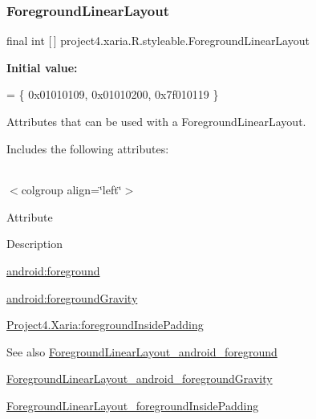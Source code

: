 \subsubsection{\texorpdfstring{Foreground\+Linear\+Layout}{ForegroundLinearLayout}}
{\footnotesize\ttfamily final int \mbox{[}$\,$\mbox{]} project4.\+xaria.\+R.\+styleable.\+Foreground\+Linear\+Layout\hspace{0.3cm}{\ttfamily [static]}}

{\bfseries Initial value\+:}
\begin{DoxyCode}
= \{
            0x01010109, 0x01010200, 0x7f010119
        \}
\end{DoxyCode}
Attributes that can be used with a Foreground\+Linear\+Layout. 

Includes the following attributes\+:

\tabulinesep=1mm
\begin{longtabu} spread 0pt [c]{*{0}{|X[-1]}|}
\hline
\end{longtabu}
$<$colgroup align=\char`\"{}left\char`\"{}$>$ 

Attribute

Description 

{\ttfamily \hyperlink{classproject4_1_1xaria_1_1R_1_1styleable_a29b782c0f85c8604b2500abe6388cf6d}{android\+:foreground}}

{\ttfamily \hyperlink{classproject4_1_1xaria_1_1R_1_1styleable_acf255ff36098cb0688c9afd1841453dd}{android\+:foreground\+Gravity}}

{\ttfamily \hyperlink{classproject4_1_1xaria_1_1R_1_1styleable_a396d6deee9a0dba4405845d2d80299bf}{Project4.\+Xaria\+:foreground\+Inside\+Padding}}

\begin{DoxySeeAlso}{See also}
\hyperlink{classproject4_1_1xaria_1_1R_1_1styleable_a29b782c0f85c8604b2500abe6388cf6d}{Foreground\+Linear\+Layout\+\_\+android\+\_\+foreground} 

\hyperlink{classproject4_1_1xaria_1_1R_1_1styleable_acf255ff36098cb0688c9afd1841453dd}{Foreground\+Linear\+Layout\+\_\+android\+\_\+foreground\+Gravity} 

\hyperlink{classproject4_1_1xaria_1_1R_1_1styleable_a396d6deee9a0dba4405845d2d80299bf}{Foreground\+Linear\+Layout\+\_\+foreground\+Inside\+Padding} 
\end{DoxySeeAlso}
\mbox{\label{classproject4_1_1xaria_1_1R_1_1styleable_a29b782c0f85c8604b2500abe6388cf6d}} 

